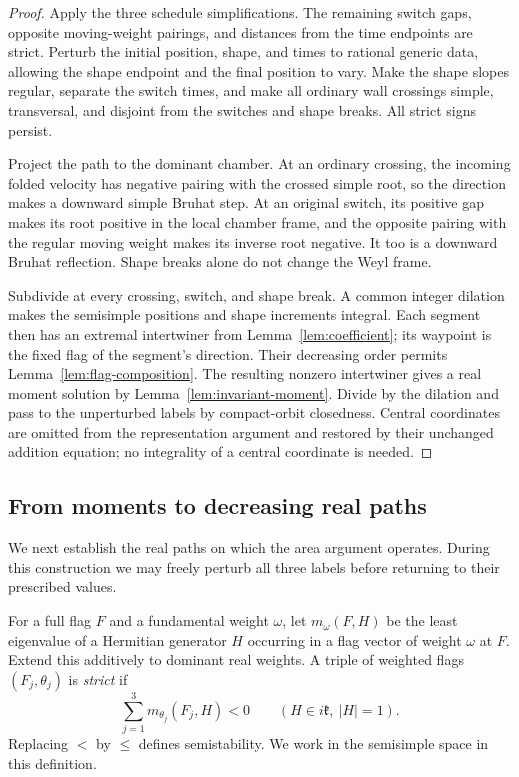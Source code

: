 \begin{proof}
Apply the three schedule simplifications.  The remaining switch gaps,
opposite moving-weight pairings, and distances from the time endpoints
are strict.  Perturb the initial position, shape, and times to rational
generic data, allowing the shape endpoint and the final position to
vary.  Make the shape slopes regular, separate the switch times, and
make all ordinary wall crossings simple, transversal, and disjoint
from the switches and shape breaks.  All strict signs persist.

Project the path to the dominant chamber.  At an ordinary crossing,
the incoming folded velocity has negative pairing with the crossed
simple root, so the direction makes a downward simple Bruhat step.
At an original switch, its positive gap makes its root positive in
the local chamber frame, and the opposite pairing with the regular
moving weight makes its inverse root negative.  It too is a downward
Bruhat reflection.  Shape breaks alone do not change the Weyl frame.

Subdivide at every crossing, switch, and shape break.  A common
integer dilation makes the semisimple positions and shape increments
integral.  Each segment then has an extremal intertwiner from
Lemma~\ref{lem:coefficient}; its waypoint is the fixed flag of the
segment's direction.  Their decreasing order permits
Lemma~\ref{lem:flag-composition}.  The resulting nonzero intertwiner
gives a real moment solution by Lemma~\ref{lem:invariant-moment}.
Divide by the dilation and pass to the unperturbed labels by
compact-orbit closedness.  Central coordinates are omitted from the
representation argument and restored by their unchanged addition
equation; no integrality of a central coordinate is needed.
\end{proof}

\subsection{From moments to decreasing real paths}

We next establish the real paths on which the area argument operates.
During this construction we may freely perturb all three labels before
returning to their prescribed values.

For a full flag $F$ and a fundamental weight $\omega$, let
$m_\omega(F,H)$ be the least eigenvalue of a Hermitian generator $H$
occurring in a flag vector of weight $\omega$ at $F$.  Extend this
additively to dominant real weights.  A triple of weighted flags
$(F_j,\theta_j)$ is \emph{strict} if
\begin{equation}\label{real:strict}
 \sum_{j=1}^3 m_{\theta_j}(F_j,H)<0
 \qquad (H\in i\mathfrak k,\ |H|=1).
\end{equation}
Replacing $<$ by $\le$ defines semistability.  We work in the
semisimple space in this definition.


